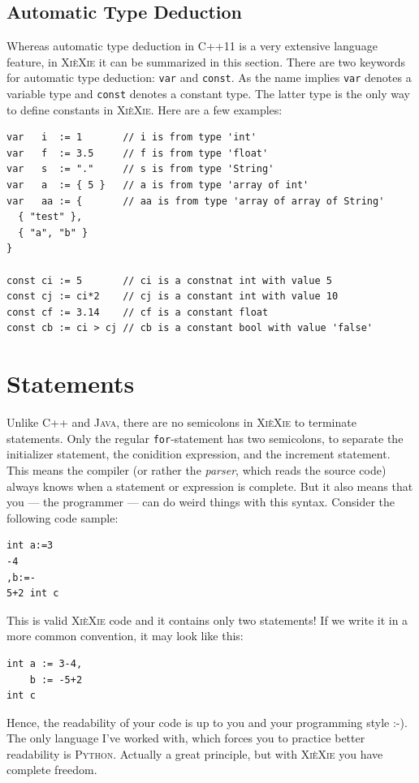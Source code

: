 \documentclass[a5paper]{report}
\def\xiexie{\textsc{Xi\`eXie}\xspace}
\def\cpp{\textsc{C++}\xspace}
\def\cppx{\textsc{C++11}\xspace}
\def\java{\textsc{Java}\xspace}
\def\python{\textsc{Python}\xspace}
\begin{document}
\subsection{Automatic Type Deduction}

Whereas automatic type deduction in \cppx is a very extensive language feature,
in \xiexie it can be summarized in this section.
There are two keywords for automatic type deduction: \texttt{var} and \texttt{const}. As the name implies
\texttt{var} denotes a variable type and \texttt{const} denotes a constant type. The latter type is the only way
to define constants in \xiexie. Here are a few examples:
\begin{lstlisting}
var   i  := 1       // i is from type 'int'
var   f  := 3.5     // f is from type 'float'
var   s  := "."     // s is from type 'String'
var   a  := { 5 }   // a is from type 'array of int'
var   aa := {       // aa is from type 'array of array of String'
  { "test" },
  { "a", "b" }
}

const ci := 5       // ci is a constnat int with value 5
const cj := ci*2    // cj is a constant int with value 10
const cf := 3.14    // cf is a constant float
const cb := ci > cj // cb is a constant bool with value 'false'
\end{lstlisting}



\section{Statements}

Unlike \cpp and \java, there are no semicolons in \xiexie to terminate statements.
Only the regular \texttt{for}-statement has two semicolons, to separate the initializer statement,
the conidition expression, and the increment statement. This means the compiler
(or rather the \textit{parser}, which reads the source code) always knows when a statement or expression is complete.
But it also means that you --- the programmer --- can do weird things with this syntax. Consider the following code sample:
\begin{lstlisting}
int a:=3
-4
,b:=-
5+2 int c
\end{lstlisting}
This is valid \xiexie code and it contains only two statements!
If we write it in a more common convention, it may look like this:
\begin{lstlisting}
int a := 3-4,
    b := -5+2
int c
\end{lstlisting}
Hence, the readability of your code is up to you and your programming style :-). The only language I've worked with,
which forces you to practice better readability is \python.
Actually a great principle, but with \xiexie you have complete freedom.
\end{document}
